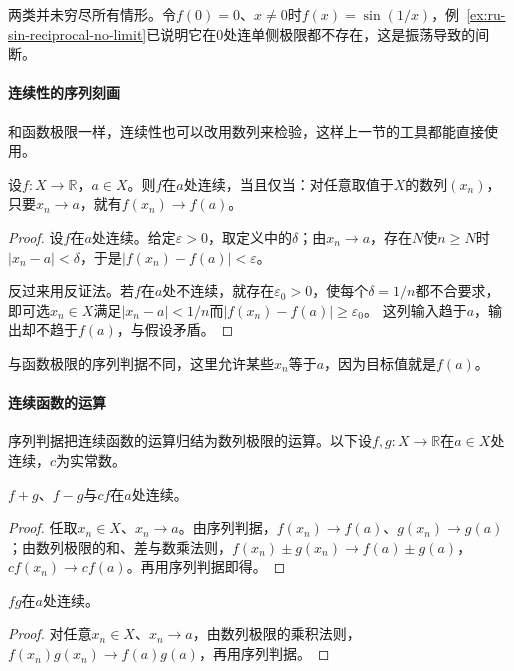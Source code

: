 两类并未穷尽所有情形。令$f(0)=0$、$x\neq0$时$f(x)=\sin(1/x)$，例~\ref{ex:ru-sin-reciprocal-no-limit}已说明它在$0$处连单侧极限都不存在，这是振荡导致的间断。

\paragraph{连续性的序列刻画}
和函数极限一样，连续性也可以改用数列来检验，这样上一节的工具都能直接使用。
\begin{theorem}[连续性的序列判据]
\label{thm:ru-continuity-sequential}
设$f:X\to\mathbb R$，$a\in X$。则$f$在$a$处连续，当且仅当：对任意取值于$X$的数列$(x_n)$，只要$x_n\to a$，就有$f(x_n)\to f(a)$。
\end{theorem}
\begin{proof}
设$f$在$a$处连续。给定$\varepsilon>0$，取定义中的$\delta$；由$x_n\to a$，存在$N$使$n\geq N$时$|x_n-a|<\delta$，于是$|f(x_n)-f(a)|<\varepsilon$。

反过来用反证法。若$f$在$a$处不连续，就存在$\varepsilon_0>0$，使每个$\delta=1/n$都不合要求，即可选$x_n\in X$满足$|x_n-a|<1/n$而$|f(x_n)-f(a)|\geq\varepsilon_0$。
这列输入趋于$a$，输出却不趋于$f(a)$，与假设矛盾。
\end{proof}
与函数极限的序列判据不同，这里允许某些$x_n$等于$a$，因为目标值就是$f(a)$。

\paragraph{连续函数的运算}
序列判据把连续函数的运算归结为数列极限的运算。以下设$f,g:X\to\mathbb R$在$a\in X$处连续，$c$为实常数。

\begin{theorem}[和、差与数乘的连续性]
\label{thm:ru-continuity-linear}
$f+g$、$f-g$与$cf$在$a$处连续。
\end{theorem}
\begin{proof}
任取$x_n\in X$、$x_n\to a$。由序列判据，$f(x_n)\to f(a)$、$g(x_n)\to g(a)$；由数列极限的和、差与数乘法则，$f(x_n)\pm g(x_n)\to f(a)\pm g(a)$，$cf(x_n)\to cf(a)$。再用序列判据即得。
\end{proof}

\begin{theorem}[积的连续性]
\label{thm:ru-continuity-product}
$fg$在$a$处连续。
\end{theorem}
\begin{proof}
对任意$x_n\in X$、$x_n\to a$，由数列极限的乘积法则，$f(x_n)g(x_n)\to f(a)g(a)$，再用序列判据。
\end{proof}


